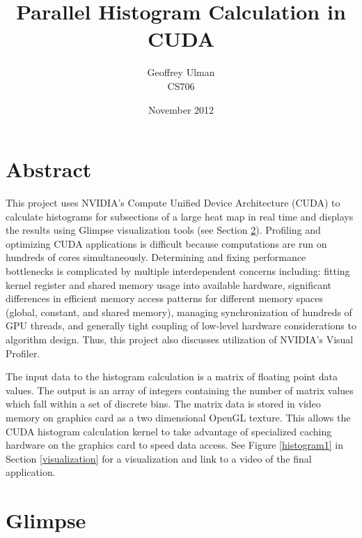 \documentclass{article}
\begin{document}
\title{Parallel Histogram Calculation in CUDA}
\author{Geoffrey Ulman\\
        CS706}
\date{November 2012}
\maketitle

\section{Abstract}\label{abstract}

This project uses NVIDIA's Compute Unified Device Architecture\cite{cuda-zone} (CUDA) to calculate histograms for subsections of a large heat map in real time and displays the results using Glimpse visualization tools (see Section \ref{glimpse}). Profiling and optimizing CUDA applications is difficult because computations are run on hundreds of cores simultaneously. Determining and fixing performance bottlenecks is complicated by multiple interdependent concerns including: fitting kernel register and shared memory usage into available hardware, significant differences in efficient memory access patterns for different memory spaces (global, constant, and shared memory), managing synchronization of hundreds of GPU threads, and generally tight coupling of low-level hardware considerations to algorithm design. Thus, this project also discusses utilization of NVIDIA's Visual Profiler\cite{nvidia-visual-profiler}.

The input data to the histogram calculation is a matrix of floating point data values. The output is an array of integers containing the number of matrix values which fall within a set of discrete bins. The matrix data is stored in video memory on graphics card as a two dimensional OpenGL texture. This allows the CUDA histogram calculation kernel to take advantage of specialized caching hardware on the graphics card to speed data access. See Figure \ref{histogram1} in Section \ref{visualization} for a visualization and link to a video of the final application.

\section{Glimpse}\label{glimpse}
\end{document}

